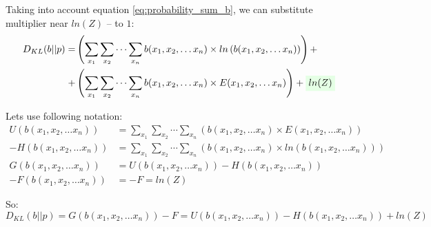 \documentclass[fleqn,leqno]{article}
\newcommand{\highlight}[1]{\colorbox{green!10}{$\displaystyle#1$}}
\begin{document}
Taking into account equation \eqref{eq:probability_sum_b}, we can substitute multiplier near $ln(Z)$ -- to $1$:
\begin{equation}
\begin{split}
D_{KL}(b||p) = & \left( \sum_{x_1} \sum_{x_2} \cdots \sum_{x_n} b(x_1, x_2, \dots x_n) \times ln \left( b(x_1, x_2, \dots x_n) \right) \right) + \\
            + & \left( \sum_{x_1} \sum_{x_2} \cdots \sum_{x_n} b(x_1, x_2, \dots x_n) \times E(x_1, x_2, \dots x_n) \right) + \highlight{ ln(Z) }
\end{split}
\end{equation}

Lets use following notation:
\begin{equation} \label{eq:U_H_G_F}
\begin{split}
U(b(x_1,x_2,\dots x_n))  & = \sum_{x_1} \sum_{x_2} \cdots \sum_{x_n} \left( b(x_1, x_2, \dots x_n) \times E(x_1, x_2, \dots x_n) \right) \\
-H(b(x_1,x_2,\dots x_n)) & = \sum_{x_1} \sum_{x_2} \cdots \sum_{x_n} \left( b(x_1, x_2, \dots x_n) \times ln \left( b(x_1, x_2, \dots x_n) \right) \right) \\
G(b(x_1,x_2,\dots x_n))  & = U(b(x_1,x_2,\dots x_n)) - H(b(x_1,x_2,\dots x_n)) \\
-F(b(x_1,x_2,\dots x_n)) & = -F = ln(Z)
\end{split}
\end{equation}

So:
\begin{equation} \label{eq:kl_divergence_via_U_H_ln_Z}
D_{KL}(b||p) = G(b(x_1,x_2,\dots x_n)) - F = U(b(x_1,x_2,\dots x_n)) - H(b(x_1,x_2,\dots x_n)) + ln(Z)
\end{equation}
\end{document}
